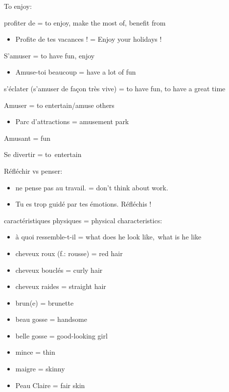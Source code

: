 To enjoy:

profiter de = to enjoy, make the most of, benefit from

\begin{itemize}
\item
  Profite de tes vacances ! = Enjoy your holidays !
\end{itemize}

S'amuser = to have fun, enjoy

\begin{itemize}
\item
  Amuse-toi beaucoup = have a lot of fun
\end{itemize}

s'éclater (s'amuser de façon très vive) = to have fun, to have a great
time

Amuser = to entertain/amuse others

\begin{itemize}
\item
  {Parc d'attractions = amusement park~}
\end{itemize}

{Amusant = fun}

{Se divertir = to~entertain~}

Réfléchir vs penser:

\begin{itemize}
\item
  ne pense pas au travail. = don't think about work.
\item
  Tu es trop guidé par tes émotions. Réfléchis !
\end{itemize}

caractéristiques physiques = physical characteristics:

\begin{itemize}
\item
  à quoi ressemble-t-il = what does he look like,~what is he like
\item
  cheveux roux (f.: rousse) = red hair
\item
  cheveux bouclés = curly hair
\item
  cheveux raides = straight hair
\item
  brun(e) = brunette
\item
  beau gosse = handsome
\item
  belle gosse = good-looking girl
\item
  mince = thin
\item
  maigre = skinny
\item
  Peau Claire = fair skin
\end{itemize}

